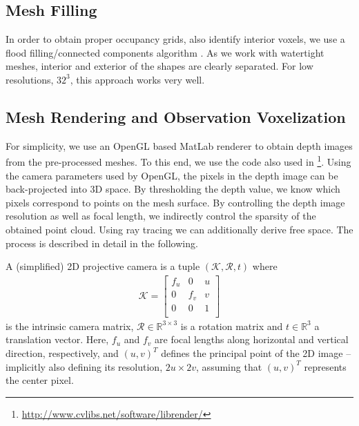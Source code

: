\subsection{Mesh Filling}
\label{sec:data-3d-filling}

In order to obtain proper occupancy grids, \ie also identify interior
voxels, we use a flood filling/connected components algorithm
\cite{Dillencourt:1992}\cite[Section~3.3]{Szeliski:2011}.
As we work with watertight meshes, interior and exterior of the shapes
are clearly separated. For low resolutions, \eg $32^3$, this approach
works very well.

\subsection{Mesh Rendering and Observation Voxelization}

For simplicity, we use an OpenGL based MatLab renderer to obtain depth images from the pre-processed meshes.
To this end, we use the code also used in \cite{GeigerWang:2015,GueneyGeiger:2015}\footnote{
  \url{http://www.cvlibs.net/software/librender/}
}. Using the camera parameters used by OpenGL, the pixels in the depth image can
be back-projected into 3D space. By thresholding the depth value,
we know which pixels correspond to points on the mesh surface. By controlling
the depth image resolution as well as focal length, we indirectly control
the sparsity of the obtained point cloud. Using ray tracing we can additionally
derive free space. The process is described in detail in the following.

\begin{definition}
  \label{def:data-2d-camera}
  A (simplified) 2D projective camera is a tuple $(\mathcal{K}, \mathcal{R}, t)$
  where
  \begin{align}
    \mathcal{K} = \left[\begin{matrix}
      f_u & 0 & u\\
      0 & f_v & v\\
      0 & 0 & 1\\
    \end{matrix}\right]
  \end{align}
  is the intrinsic camera matrix,
  $\mathcal{R} \in \mathbb{R}^{3 \times 3}$ is a rotation matrix and
  $t \in \mathbb{R}^3$ a translation vector. Here, $f_u$ and $f_v$ are focal lengths
  along horizontal and vertical direction, respectively,
  and $(u, v)^T$ defines the principal point of the 2D image -- implicitly
  also defining its resolution, $2u \times 2v$, assuming that $(u,v)^T$ represents the
  center pixel.
\end{definition}

